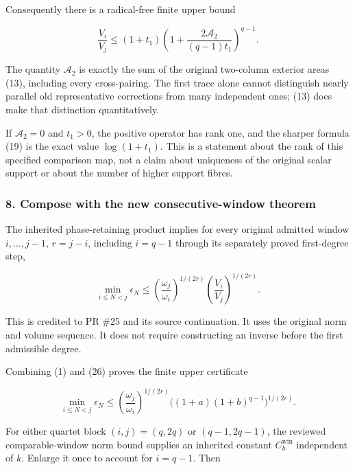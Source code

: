 Consequently there is a radical-free finite upper bound

\[
 \boxed{
 \frac{V_i}{V_j}
 \le(1+t_1)
 \left(1+\frac{2\mathcal A_2}{(q-1)t_1}\right)^{q-1}.
 }                                                             \tag{25}
\]

The quantity \(\mathcal A_2\) is exactly the sum of the original two-column exterior areas (13), including every cross-pairing. The first trace alone cannot distinguish nearly parallel old representative corrections from many independent ones; (13) does make that distinction quantitatively.

If \(\mathcal A_2=0\) and \(t_1>0\), the positive operator has rank one, and the sharper formula (19) is the exact value \(\log(1+t_1)\). This is a statement about the rank of this specified comparison map, not a claim about uniqueness of the original scalar support or about the number of higher support fibres.

\subsubsection{8. Compose with the new consecutive-window theorem}\label{endpoint-relation_moment_original--compose-with-the-new-consecutive-window-theorem}

The inherited phase-retaining product implies for every original admitted window \(i,\ldots,j-1\), \(r=j-i\), including \(i=q-1\) through its separately proved first-degree step,

\[
 \min_{i\le N<j}\epsilon_N
 \le\left(\frac{\omega_j}{\omega_i}\right)^{1/(2r)}
 \left(\frac{V_i}{V_j}\right)^{1/(2r)}.                         \tag{26}
\]

This is credited to PR \#25 and its source continuation. It uses the original norm and volume sequence. It does not require constructing an inverse before the first admissible degree.

Combining (1) and (26) proves the finite upper certificate

\[
 \boxed{
 \min_{i\le N<j}\epsilon_N
 \le\left(\frac{\omega_j}{\omega_i}\right)^{1/(2r)}
 \bigl((1+a)(1+b)^{q-1}\bigr)^{1/(2r)}.
 }                                                             \tag{27}
\]

For either quartet block \((i,j)=(q,2q)\) or \((q-1,2q-1)\), the reviewed comparable-window norm bound supplies an inherited constant \(C_h^{\mathrm{win}}\) independent of \(k\). Enlarge it once to account for \(i=q-1\). Then


